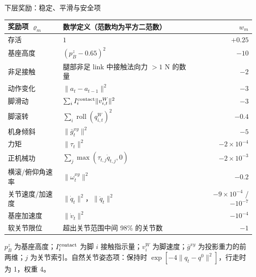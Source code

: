 \documentclass[aspectratio=169,10pt]{beamer}
\begin{document}
\begin{frame}{下层奖励：稳定、平滑与安全项}
\scriptsize
\begin{tabular}{p{}p{}r}
\toprule
奖励项 $\varrho_m$ & 数学定义（范数均为平方二范数） & $w_m$\\
\midrule
存活 & $1$ & $+0.25$\\
基座高度 & $(p^z_B-0.65)^2$ & $-10$\\
非足接触 & 腿部非足 link 中接触法向力 $>1$ N 的数量 & $-2$\\
动作变化 & $\|a_t-a_{t-1}\|^2$ & $-3$\\
脚滑动 & $\sum_i I_i^{\rm contact}\|v^W_{i,t}\|^2$ & $-3$\\
脚滚转 & $\sum_i \operatorname{roll}(q^W_{i,t})^2$ & $-0.4$\\
机身倾斜 & $\|\bar g_t^{xy}\|^2$ & $-5$\\
力矩 & $\|\tau_t\|^2$ & $-2\!\times\!10^{-4}$\\
正机械功 & $\sum_j\max(\tau_{t,j}\dot q_{t,j},0)$ & $-2\!\times\!10^{-3}$\\
横滚/俯仰角速率 & $\|\omega_t^{xy}\|^2$ & $-0.2$\\
关节速度/加速度 & $\|\dot q_t\|^2$，$\|\ddot q_t\|^2$ & $-9\!\times\!10^{-4}$ / $-10^{-7}$\\
基座加速度 & $\|\dot v_t\|^2$ & $-10^{-4}$\\
软关节限位 & 超出关节范围中间 98\% 的关节数 & $-1$\\
\bottomrule
\end{tabular}
\vspace{0.3em}
$p^z_B$ 为基座高度；$I_i^{\rm contact}$ 为脚 $i$ 接触指示量；$v^W_i$ 为脚速度；$\bar g^{xy}$ 为投影重力的前两维；$j$ 为关节索引。自然关节姿态项：保持时 $\exp[-4\|q_t-q^0\|^2]$，行走时为 1，权重 4。
\end{frame}
\end{document}
